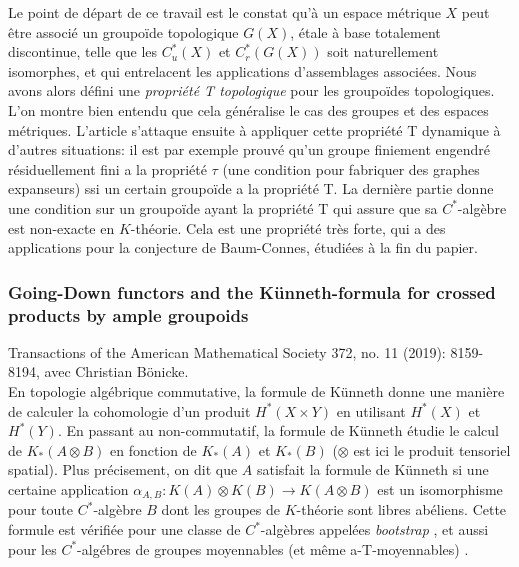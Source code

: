 \documentclass[a4paper,11pt]{article}
\begin{document}
Le point de d\'epart de ce travail est le constat qu'\`a un espace m\'etrique $X$ peut \^etre associ\'e un groupo\"ide topologique $G(X)$, \'etale \`a base totalement discontinue, telle que les $C^*_u(X)$ et $C_r^*(G(X))$ soit naturellement isomorphes, et qui entrelacent les applications d'assemblages associ\'ees. Nous avons alors d\'efini une \textit{propri\'et\'e T topologique} pour les groupo\"ides topologiques. L'on montre bien entendu que cela g\'en\'eralise le cas des groupes et des espaces m\'etriques. L'article s'attaque ensuite \`a appliquer cette propri\'et\'e T dynamique \`a d'autres situations: il est par exemple prouv\'e qu'un groupe finiement engendr\'e r\'esiduellement fini a la propri\'et\'e $\tau$ (une condition pour fabriquer des graphes expanseurs) ssi un certain groupo\"ide a la propri\'et\'e T. La derni\`ere partie donne une condition sur un groupo\"ide ayant la propri\'et\'e T qui assure que sa $C^*$-alg\`ebre est non-exacte en $K$-th\'eorie. Cela est une propri\'et\'e tr\`es forte, qui a des applications pour la conjecture de Baum-Connes, \'etudi\'ees \`a la fin du papier. 

\subsubsection*{Going-Down functors and the Künneth-formula for crossed products by ample groupoids}

Transactions of the American Mathematical Society 372, no. 11 (2019): 8159-8194, avec Christian Bönicke.\\

En topologie alg\'ebrique commutative, la formule de K\"unneth donne une mani\`ere de calculer la cohomologie d'un produit $H^*(X\times Y)$ en utilisant $H^*(X)$ et $H^*(Y)$. En passant au non-commutatif, la formule de K\"unneth \'etudie le calcul de $K_*(A \otimes B)$ en fonction de $K_*(A)$ et $K_*(B)$ ($\otimes$ est ici le produit tensoriel spatial). Plus pr\'ecisement, on dit que $A$ satisfait la formule de K\"unneth si une certaine application $\alpha_{A,B}: K(A)\otimes K(B) \rightarrow K(A\otimes B)$ est un isomorphisme pour toute $C^*$-alg\`ebre $B$ dont les groupes de $K$-th\'eorie sont libres ab\'eliens. Cette formule est v\'erifi\'ee pour une classe de $C^*$-alg\`ebres appel\'ees \textit{bootstrap} \cite{rosenberg1987kunneth}, et aussi pour les $C^*$-alg\'ebres de groupes moyennables (et m\^eme a-T-moyennables) \cite{BaumConnesHigson}\cite{TuThese}. \\
\end{document}
